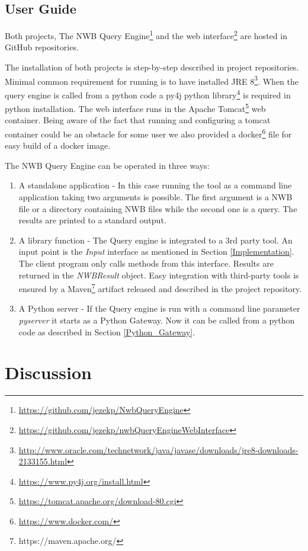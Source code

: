 \documentclass[utf8]{frontiersSCNS} %
\begin{document}
\subsection{User Guide}

Both projects, The NWB Query Engine\footnote{\url{https://github.com/jezekp/NwbQueryEngine}} and the web interface\footnote{\url{https://github.com/jezekp/nwbQueryEngineWebInterface}} are hosted in GitHub repositories. 

The installation of both projects is step-by-step described in project repositories.  Minimal common requirement for running is to have installed JRE 8\footnote{\url{http://www.oracle.com/technetwork/java/javase/downloads/jre8-downloads-2133155.html}}. When the query engine is called from a python code a py4j python library\footnote{\url{https://www.py4j.org/install.html}} is required in python installation. The web interface runs in the Apache Tomcat\footnote{\url{https://tomcat.apache.org/download-80.cgi}} web container. Being aware of the fact that running and configuring a tomcat container could be an obstacle for some user we also provided a docker\footnote{\url{https://www.docker.com/}} file for easy build of a docker image.

The NWB Query Engine can be operated in three ways:
\begin{enumerate}
 \item A standalone application - In this case running the tool as a command line application taking two arguments is possible. The first argument is a NWB file or a directory containing NWB files while the second one is a query. The results are printed to a standard output.
 \item A library function - The Query engine is integrated to a 3rd party tool. An input point is the \emph{Input} interface as mentioned in Section \ref{Implementation}. The client program only calls methods from this interface. Results are returned in the \emph{NWBResult} object. Easy integration with third-party tools is ensured by a Maven\footnote{https://maven.apache.org/} artifact released and described in the project repository.
 \item A Python server - If the Query engine is run with a command line parameter \emph{pyserver} it starts as a Python Gateway. Now it can be called from a python code as described in Section \ref{Python_Gateway}.
\end{enumerate}


\section{Discussion}
\label{Discussion}
\end{document}
